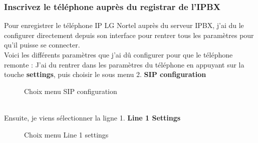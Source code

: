 \documentclass[12pt, a4paper]{article}
\begin{document}
	\subsubsection*{Inscrivez le téléphone auprès du registrar de l'IPBX}
	Pour enregistrer le téléphone IP LG Nortel auprès du serveur IPBX, j'ai du
	le configurer directement depuis son interface pour rentrer tous les paramètres 
	pour qu'il puisse se connecter. \\
	Voici les différents paramètres que j'ai dû configurer pour que le téléphone remonte :
	J'ai du rentrer dans les paramètres du téléphone en appuyant sur la touche 
	\textbf{settings}, puis choisir le sous menu 2. \textbf{SIP configuration}
	\begin{figure}[h]
		\centering
		\caption{Choix menu SIP configuration}
		\label{fig:set}
	\end{figure}\\
	Ensuite, je viens sélectionner la ligne 1. \textbf{Line 1 Settings}
	\begin{figure}[h]
		\centering
		\caption{Choix menu Line 1 settings}
		\label{fig:set}
	\end{figure}\\
\end{document}
